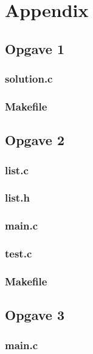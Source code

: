 \section{Appendix}

\subsection*{Opgave 1}
\subsubsection*{solution.c}

\subsubsection*{Makefile}


\subsection*{Opgave 2}
\subsubsection*{list.c}

\subsubsection*{list.h}

\subsubsection*{main.c}

\subsubsection*{test.c}

\subsubsection*{Makefile}


\subsection*{Opgave 3}
\subsubsection*{main.c}

